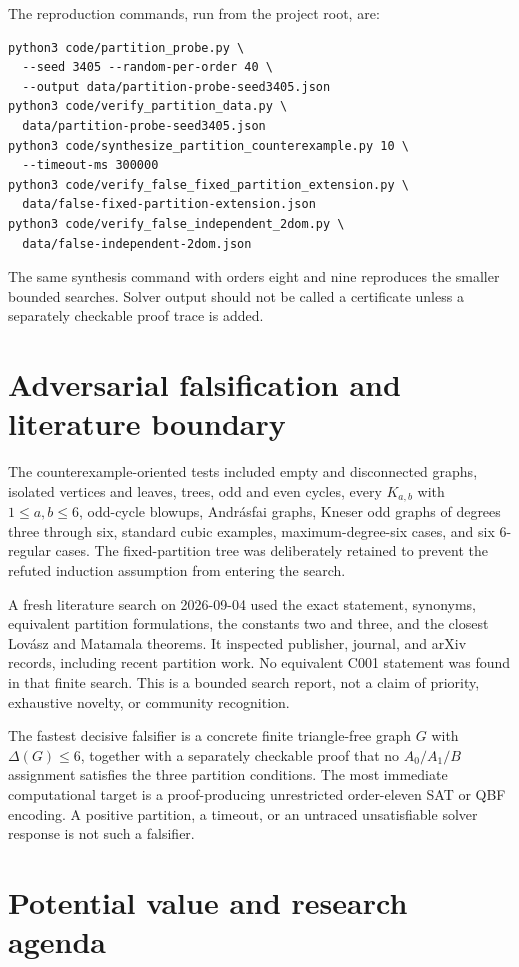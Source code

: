 \documentclass[11pt]{amsart}
\theoremstyle{definition}
\begin{document}
The reproduction commands, run from the project root, are:
\begin{verbatim}
python3 code/partition_probe.py \
  --seed 3405 --random-per-order 40 \
  --output data/partition-probe-seed3405.json
python3 code/verify_partition_data.py \
  data/partition-probe-seed3405.json
python3 code/synthesize_partition_counterexample.py 10 \
  --timeout-ms 300000
python3 code/verify_false_fixed_partition_extension.py \
  data/false-fixed-partition-extension.json
python3 code/verify_false_independent_2dom.py \
  data/false-independent-2dom.json
\end{verbatim}
The same synthesis command with orders eight and nine reproduces the smaller
bounded searches.  Solver output should not be called a certificate unless a
separately checkable proof trace is added.

\section{Adversarial falsification and literature boundary}

The counterexample-oriented tests included empty and disconnected graphs,
isolated vertices and leaves, trees, odd and even cycles, every
$K_{a,b}$ with $1\leq a,b\leq6$, odd-cycle blowups, Andr\'asfai graphs,
Kneser odd graphs of degrees three through six, standard cubic examples,
maximum-degree-six cases, and six $6$-regular cases.  The fixed-partition tree
was deliberately retained to prevent the refuted induction assumption from
entering the search.

A fresh literature search on 2026-09-04 used the exact statement, synonyms,
equivalent partition formulations, the constants two and three, and the
closest Lov\'asz and Matamala theorems.  It inspected publisher, journal, and
arXiv records, including recent partition work.  No equivalent C001 statement
was found in that finite search.  This is a bounded search report, not a claim
of priority, exhaustive novelty, or community recognition.

The fastest decisive falsifier is a concrete finite triangle-free graph
$G$ with $\Delta(G)\leq6$, together with a separately checkable proof that no
$A_0/A_1/B$ assignment satisfies the three partition conditions.  The most
immediate computational target is a proof-producing unrestricted order-eleven
SAT or QBF encoding.  A positive partition, a timeout, or an untraced
unsatisfiable solver response is not such a falsifier.

\section{Potential value and research agenda}
\end{document}
